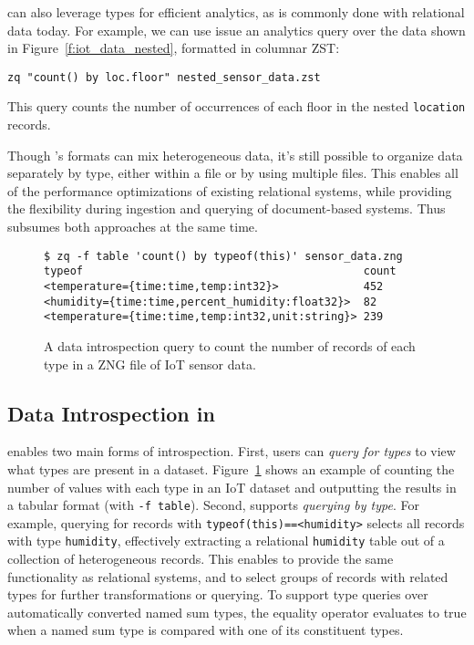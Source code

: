 \sys{} can also leverage types for efficient analytics, as is commonly done with relational data today. For example, we can use issue an analytics query over the data shown in Figure~\ref{f:iot_data_nested}, formatted in columnar ZST:

\texttt{zq "count() by loc.floor" nested\_sensor\_data.zst}

\noindent{}This query counts the number of occurrences of each floor in the nested \texttt{location} records.

Though \sys{}'s formats can mix heterogeneous data, it's still possible to organize data separately by type, either within a file or by using multiple files. This enables all of the performance optimizations of existing relational systems, while providing the flexibility during ingestion and querying of document-based systems. Thus \sys{} subsumes both approaches at the same time.



\begin{figure}
    \begin{verbatim}
$ zq -f table 'count() by typeof(this)' sensor_data.zng
typeof                                           count
<temperature={time:time,temp:int32}>             452
<humidity={time:time,percent_humidity:float32}>  82
<temperature={time:time,temp:int32,unit:string}> 239
    \end{verbatim}
    \vspace{-1.3em}
    \caption{A data introspection query to count the number of records of each type in a ZNG file of IoT sensor data. }
    \label{f:count_by_type}
    \vspace{-1.5em}
\end{figure}

\vspace{-0.9em}
\subsection{Data Introspection in \sys{}} \label{ss:zed_in_action_types}

\sys{} enables two main forms of introspection. First, users can {\em query for types} to view what types are present in a dataset. Figure~\ref{f:count_by_type} shows an example of counting the number of values with each type in an IoT dataset and outputting the results in a tabular format (with \texttt{-f table}). Second, \sys{} supports {\em querying by type}. For example, querying for records with \texttt{typeof(this)==<humidity>} selects all records with type \texttt{humidity}, effectively extracting a relational \texttt{humidity} table out of a collection of heterogeneous records.
This enables \sys{} to provide the same functionality as relational systems, and to select groups of records with related types for further transformations or querying. To support type queries over automatically converted named sum types, the equality operator evaluates to true when a named sum type is compared with one of its constituent types.

